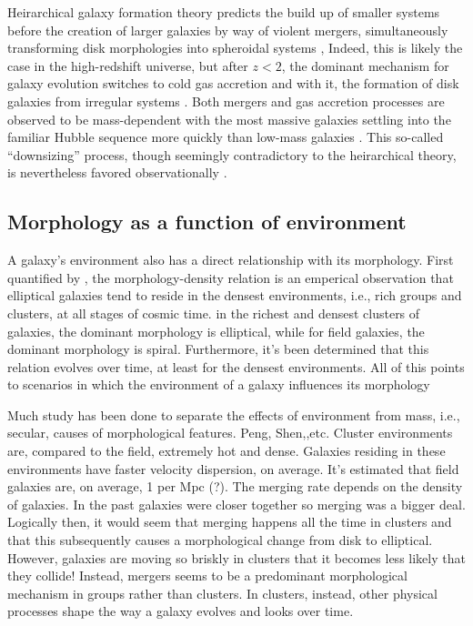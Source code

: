 Heirarchical galaxy formation theory predicts the build up of smaller systems before the creation of larger galaxies by way of violent mergers, simultaneously transforming disk morphologies into spheroidal systems \citep{Driver2013,Bluck2009,Man2012}, Indeed, this is likely the case in the high-redshift universe, but after $z<2$, the dominant mechanism for galaxy evolution switches to cold gas accretion and with it, the formation of disk galaxies from irregular systems \citep{Conselice2013}. Both mergers and gas accretion processes are observed to be mass-dependent with the most massive galaxies settling into the familiar Hubble sequence more quickly than low-mass galaxies \citep{Buitrago2013,Conselice2011,Mortlock2013}. This so-called ``downsizing'' process, though seemingly contradictory to the heirarchical theory, is nevertheless favored observationally \citep{Cowie1996, Brinchmann2000, Bundy2005}. 

\subsection{Morphology as a function of environment}
A galaxy's environment also has a direct relationship with its morphology. First quantified by \cite{Dressler1980}, the morphology-density relation is an emperical observation that elliptical galaxies tend to reside in the densest environments, i.e., rich groups and clusters, at all stages of cosmic time. in the richest and densest clusters of galaxies, the dominant morphology is elliptical, while for field galaxies, the dominant morphology is spiral. Furthermore, it's been determined that this relation evolves over time, at least for the densest environments. All of this points to scenarios in which the environment of a galaxy influences its morphology \citep[e.g.,][]{Fasano2000, Shen2003, Smith2005, Peng2010}

Much study has been done to separate the effects of environment from mass, i.e., secular, causes of morphological features. Peng, Shen,,etc. Cluster environments are, compared to the field, extremely hot and dense. Galaxies residing in these environments have faster velocity dispersion, on average.   It's estimated that field galaxies are, on average, 1 per Mpc (?). The merging rate depends on the density of galaxies. In the past galaxies were closer together so merging was a bigger deal. Logically then, it would seem that merging happens all the time in clusters and that this subsequently causes a morphological change from disk to elliptical. However, galaxies are moving so briskly in clusters that it becomes less likely that they collide! Instead, mergers seems to be a predominant morphological mechanism in groups rather than clusters. In clusters, instead, other physical processes shape the way a galaxy evolves and looks over time. 

